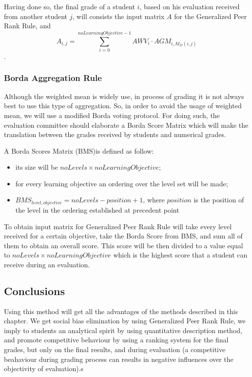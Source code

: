 Having done so, the final grade of a student $i$, based on his evaluation received from another student $j$, will consists the input matrix $A$ for the Generalized Peer Rank Rule, and
$$A_{i,j} = \sum\limits_{i=0}^{noLearningObjective - 1} AWV_i \cdot AGM_{i, M_D (i, j)}$$.
\subsubsection{Borda Aggregation Rule}
Although the weighted mean is widely use, in process of grading it is not always best to use this type of aggregation. So, in order to avoid the usage of weighted mean, we will use a modified Borda \cite{borda} voting protocol. For doing such, the evaluation committee should elaborate a Borda Score Matrix which will make the translation between the grades received by students and numerical grades.

A Borda Scores Matrix (BMS)is defined as follow:
\begin{itemize}
	\item its size will be $noLevels \times noLearningObjective$;
	\item for every learning objective an ordering over the level set will be made;
	\item $BMS_{level, objective} = noLevels - position + 1$, where $position$ is the position of the level in the ordering established at precedent point
\end{itemize}

To obtain input matrix for Generalized Peer Rank Rule will take every level received for a certain objective, take the Borda Score from BMS, and sum all of them to obtain an overall score. This score will be then divided to a value equal to $noLevels \times noLearningObjective$ which is the highest score that a student can receive during an evaluation.

\subsection{Conclusions}
Using this method will get all the advantages of the methods described in this chapter. We get social bias elimination by using Generalized Peer Rank Rule, we imply to students an analytical spirit by using quantitative description method, and promote competitive behaviour by using a ranking system for the final grades, but only on the final results, and during evaluation (a competitive beahaviour during grading process can results in negative influences over the objectivity of evaluation).s

